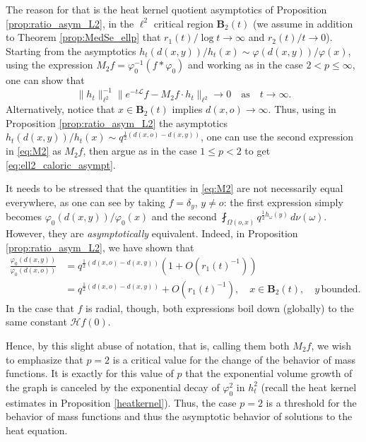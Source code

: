 \documentclass[11pt,a4paper,reqno]{amsart}
\renewcommand\mathcal{\mathscr}
\theoremstyle{plain}
\theoremstyle{remark}
\theoremstyle{definition}
\theoremstyle{remark}
\numberwithin{equation}{section}
\begin{document}
		The reason for that is the heat kernel quotient asymptotics of Proposition \ref{prop:ratio_asym_L2}, in the $\ell^2$ critical region $\textbf{B}_2(t)$ (we assume in addition to Theorem \ref{prop:MedSe_ellp} that $r_1(t)/\log t\to \infty$ and $r_2(t)/t\to 0$). Starting from the asymptotics $h_t(d(x,y))/h_t(x)\sim \varphi(d(x,y))/\varphi(x)$, using  the expression $M_2f=\varphi_0^{-1}(f\ast\varphi_0)$ and working as in the case $2<p\leq \infty$, one can show that 
\begin{equation}\label{eq:ell2_caloric_asympt}
		\|h_t\|_{\ell^2}^{-1}\|e^{-t\mathcal{L}}f-M_2f\cdot h_t\|_{\ell^2}\to 0 \quad \text{as} \quad  t\to \infty.
		\end{equation}
		Alternatively, notice that $x\in \textbf{B}_2(t)$ implies $d(x,o)\to \infty$. Thus, using in Proposition \ref{prop:ratio_asym_L2} the asymptotics $h_t(d(x,y))/h_t(x)\sim q^{\frac{1}{2}(d(x,o)-d(x,y))}$, one can use the second expression in \eqref{eq:M2} as $M_2f$, then argue as in the case $1\leq p<2$  to get \eqref{eq:ell2_caloric_asympt}. 
		
		It needs to be stressed that the quantities in \eqref{eq:M2} are not necessarily equal everywhere, as one can see by taking $f=\delta_y$, $y\neq o$: the first expression simply becomes $\varphi_0(d(x,y))/\varphi_0(x)$ and the second $\fint_{\Omega(o,x)}q^{\frac{1}{2}h_{\omega}(y)}\, 
d\nu(\omega)$. However, they are \emph{asymptotically} equivalent. Indeed, in Proposition \ref{prop:ratio_asym_L2}, we have shown that
	\begin{align*}
		\frac{\varphi_0(d(x,y))}{\varphi_0(d(x,o))}
		&= q^{\frac{1}{2}(d(x,o)-d(x,y))}(1+O(r_1(t)^{-1}))\\
		&=q^{\frac{1}{2}(d(x,o)-d(x,y))}+O(r_1(t)^{-1}),\quad x\in \textbf{B}_2(t), \quad y \, \text{bounded}.
	\end{align*}
	 In the case that $f$ is radial, though,  both expressions boil down (globally) to the same constant $\mathcal{H}f(0)$. 
	
	
	Hence, by this slight abuse of notation, that is, calling them both $M_2f$, we wish to emphasize that $p=2$ is a critical value for the change of the behavior of mass functions. It is exactly for this value of $p$ that the exponential volume growth of the graph is canceled by the exponential decay of $\varphi_0^2$ in $h_t^2$ (recall the heat kernel estimates in Proposition \ref{heatkernel}).  Thus, the case $p=2$ is a threshold for the behavior of mass functions and thus the asymptotic behavior of solutions to the heat equation.
	
\end{document}
